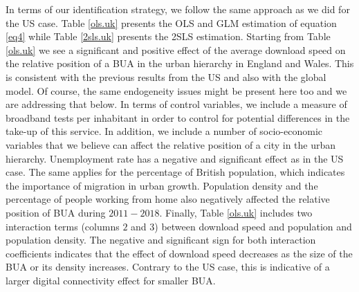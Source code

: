 \documentclass[10pt,letterpaper]{article}
\begin{document}
In terms of our identification strategy, we follow the same approach as
we did for the US case. Table \ref{ols.uk} presents the OLS and GLM
estimation of equation \ref{eq4} while Table \ref{2sls.uk} presents the
2SLS estimation. Starting from Table \ref{ols.uk} we see a significant
and positive effect of the average download speed on the relative
position of a BUA in the urban hierarchy in England and Wales. This is
consistent with the previous results from the US and also with the
global model. Of course, the same endogeneity issues might be present
here too and we are addressing that below. In terms of control
variables, we include a measure of broadband tests per inhabitant in
order to control for potential differences in the take-up of this
service. In addition, we include a number of socio-economic variables
that we believe can affect the relative position of a city in the urban
hierarchy. Unemployment rate has a negative and significant effect as in
the US case. The same applies for the percentage of British population,
which indicates the importance of migration in urban growth. Population
density and the percentage of people working from home also negatively
affected the relative position of BUA during \(2011-2018\). Finally,
Table \ref{ols.uk} includes two interaction terms (columns \(2\) and
\(3\)) between download speed and population and population density. The
negative and significant sign for both interaction coefficients
indicates that the effect of download speed decreases as the size of the
BUA or its density increases. Contrary to the US case, this is
indicative of a larger digital connectivity effect for smaller BUA.
\end{document}
